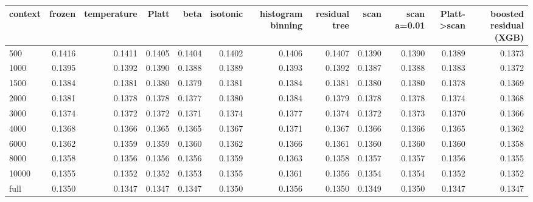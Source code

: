 \begin{tabular}{lrrrrrrrrrrr}
\toprule
context & frozen & temperature & Platt & beta & isotonic & histogram binning & residual tree & scan & scan a=0.01 & Platt->scan & boosted residual (XGB) \\
\midrule
500 & 0.1416 & 0.1411 & 0.1405 & 0.1404 & 0.1402 & 0.1406 & 0.1407 & 0.1390 & 0.1390 & 0.1389 & 0.1373 \\
1000 & 0.1395 & 0.1392 & 0.1390 & 0.1388 & 0.1389 & 0.1393 & 0.1392 & 0.1387 & 0.1388 & 0.1383 & 0.1372 \\
1500 & 0.1384 & 0.1381 & 0.1380 & 0.1379 & 0.1381 & 0.1384 & 0.1381 & 0.1380 & 0.1380 & 0.1378 & 0.1369 \\
2000 & 0.1381 & 0.1378 & 0.1378 & 0.1377 & 0.1380 & 0.1384 & 0.1379 & 0.1378 & 0.1378 & 0.1374 & 0.1368 \\
3000 & 0.1374 & 0.1372 & 0.1372 & 0.1371 & 0.1374 & 0.1377 & 0.1374 & 0.1372 & 0.1373 & 0.1370 & 0.1366 \\
4000 & 0.1368 & 0.1366 & 0.1365 & 0.1365 & 0.1367 & 0.1371 & 0.1367 & 0.1366 & 0.1366 & 0.1365 & 0.1362 \\
6000 & 0.1362 & 0.1359 & 0.1359 & 0.1360 & 0.1362 & 0.1366 & 0.1361 & 0.1360 & 0.1360 & 0.1360 & 0.1358 \\
8000 & 0.1358 & 0.1356 & 0.1356 & 0.1356 & 0.1359 & 0.1363 & 0.1358 & 0.1357 & 0.1357 & 0.1356 & 0.1355 \\
10000 & 0.1355 & 0.1352 & 0.1352 & 0.1353 & 0.1355 & 0.1361 & 0.1356 & 0.1354 & 0.1354 & 0.1352 & 0.1352 \\
full & 0.1350 & 0.1347 & 0.1347 & 0.1347 & 0.1350 & 0.1356 & 0.1350 & 0.1349 & 0.1350 & 0.1347 & 0.1347 \\
\bottomrule
\end{tabular}
